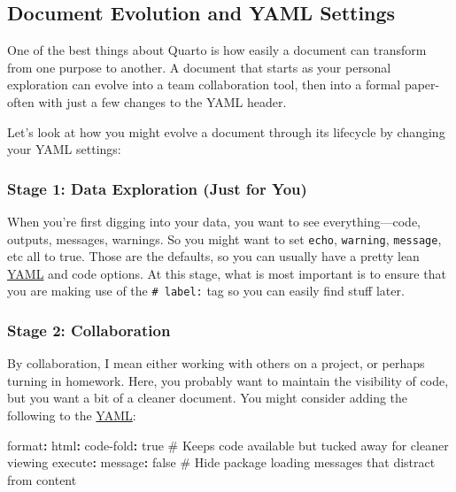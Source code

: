 \documentclass[
  letterpaper,
]{book}
\newenvironment{Shaded}{\begin{snugshade}}{\end{snugshade}}
\newcommand{\AttributeTok}[1]{\textcolor[rgb]{0.40,0.45,0.13}{#1}}
\newcommand{\CharTok}[1]{\textcolor[rgb]{0.13,0.47,0.30}{#1}}
\newcommand{\CommentTok}[1]{\textcolor[rgb]{0.37,0.37,0.37}{#1}}
\newcommand{\FunctionTok}[1]{\textcolor[rgb]{0.28,0.35,0.67}{#1}}
\newcommand{\KeywordTok}[1]{\textcolor[rgb]{0.00,0.23,0.31}{\textbf{#1}}}
\begin{document}
\subsection{Document Evolution and YAML
Settings}\label{sec-litprog-docevol}

One of the best things about Quarto is how easily a document can
transform from one purpose to another. A document that starts as your
personal exploration can evolve into a team collaboration tool, then
into a formal paper-often with just a few changes to the YAML header.

Let's look at how you might evolve a document through its lifecycle by
changing your YAML settings:

\subsubsection{Stage 1: Data Exploration (Just for
You)}\label{stage-1-data-exploration-just-for-you}

When you're first digging into your data, you want to see
everything---code, outputs, messages, warnings. So you might want to set
\texttt{echo}, \texttt{warning}, \texttt{message}, etc all to true.
Those are the defaults, so you can usually have a pretty lean
\hyperref[yaml]{YAML} and code options. At this stage, what is most
important is to ensure that you are making use of the
\texttt{\#\textbar{}\ label:} tag so you can easily find stuff later.

\subsubsection{Stage 2: Collaboration}\label{stage-2-collaboration}

By collaboration, I mean either working with others on a project, or
perhaps turning in homework. Here, you probably want to maintain the
visibility of code, but you want a bit of a cleaner document. You might
consider adding the following to the \hyperref[yaml]{YAML}:

\begin{Shaded}
\begin{Highlighting}[]
\FunctionTok{format}\KeywordTok{:}
\AttributeTok{  }\FunctionTok{html}\KeywordTok{:}
\AttributeTok{    }\FunctionTok{code{-}fold}\KeywordTok{:}\AttributeTok{ }\CharTok{true}\CommentTok{  \# Keeps code available but tucked away for cleaner viewing}
\AttributeTok{    }
\FunctionTok{execute}\KeywordTok{:}
\AttributeTok{  }\FunctionTok{message}\KeywordTok{:}\AttributeTok{ }\CharTok{false}\CommentTok{     \# Hide package loading messages that distract from content}
\end{Highlighting}
\end{Shaded}
\end{document}
